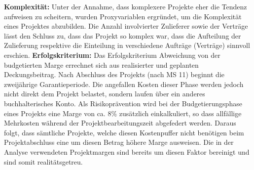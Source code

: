 \documentclass[11pt]{article}
\begin{document}
\newline\newline\textbf{Komplexität:} Unter der Annahme, dass komplexere Projekte eher die Tendenz aufweisen zu scheitern, wurden Proxyvariablen ergründet, um die Komplexität eines Projektes abzubilden. Die Anzahl involvierter Zulieferer sowie der Verträge lässt den Schluss zu, dass das Projekt so komplex war, dass die Aufteilung der Zulieferung respektive die Einteilung in verschiedene Aufträge (Verträge) sinnvoll erschien.
\newline\newline\textbf{Erfolgskriterium:} Das Erfolgskriterium Abweichung von der budgetierten Marge errechnet sich aus realisierter und geplanten Deckungsbeitrag. Nach Abschluss des Projekts (nach MS 11) beginnt die zweijährige Garantieperiode. Die angefallen Kosten dieser Phase werden jedoch nicht direkt dem Projekt belastet, sondern laufen über ein anderes buchhalterisches Konto. Als Risikoprävention wird bei der Budgetierungsphase eines Projekts eine Marge von ca. 8\% zusätzlich einkalkuliert, so dass allfällige Mehrkosten während der Projektbearbeitungszeit abgefedert werden. Daraus folgt, dass sämtliche Projekte, welche diesen Kostenpuffer nicht benötigen beim Projektabschluss eine um diesen Betrag höhere Marge ausweisen. Die in der Analyse verwendeten Projektmargen sind bereits um diesen Faktor bereinigt und sind somit realitätsgetreu.
\newpage
\end{document}
